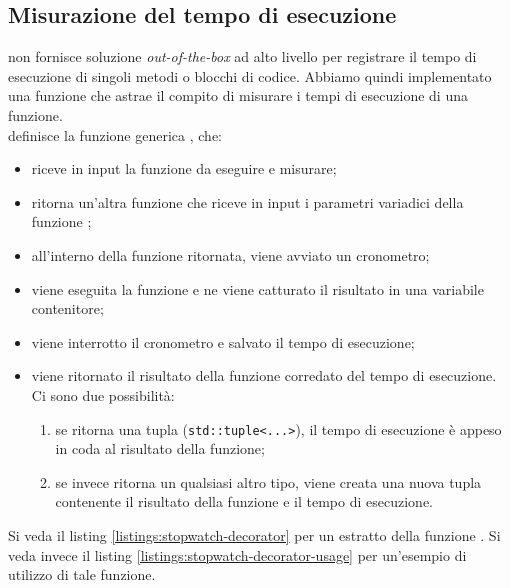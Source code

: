 \subsection{Misurazione del tempo di esecuzione}
\label{sub:stopwatch}

\noindent {} non fornisce soluzione \textit{out-of-the-box} ad alto livello per registrare il tempo di esecuzione di singoli metodi o blocchi di codice. Abbiamo quindi implementato una funzione  che astrae il compito di misurare i tempi di esecuzione di una funzione. \\

\noindent {} definisce la funzione generica , che:

\begin{itemize}
    \item riceve in input la funzione  da eseguire e misurare;
    \item ritorna un'altra funzione che riceve in input i parametri variadici  della funzione ;
    \item all'interno della funzione ritornata, viene avviato un cronometro;
    \item viene eseguita la funzione e ne viene catturato il risultato in una variabile contenitore;
    \item viene interrotto il cronometro e salvato il tempo di esecuzione;
    \item viene ritornato il risultato della funzione corredato del tempo di esecuzione. Ci sono due possibilità:
    \begin{enumerate}
        \item se  ritorna una tupla (\texttt{std::tuple<...>}), il tempo di esecuzione è appeso in coda al risultato della funzione;
        \item se invece  ritorna un qualsiasi altro tipo, viene creata una nuova tupla contenente il risultato della funzione e il tempo di esecuzione.
    \end{enumerate}
\end{itemize}

Si veda il listing \ref{listings:stopwatch-decorator} per un estratto della funzione .
Si veda invece il listing \ref{listings:stopwatch-decorator-usage} per un'esempio di utilizzo di tale funzione.

